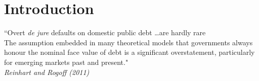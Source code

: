 \documentclass[12pt, aspectratio=169, xcolor=dvipsnames]{beamer}  %
\begin{document}






\section{Introduction}


\begin{frame}
	\begin{flushright}
	\begin{minipage}{.65\linewidth}
		\setlength{\parskip}{0pt}
		\begin{flushright}
			``Overt \textit{de jure} defaults on domestic public debt \ldots are hardly rare \\
			The assumption embedded in many theoretical models that governments always honour the nominal face value of debt is a significant overstatement, particularly for emerging markets past and present." \\ \vspace{0.4cm}
			\textit{Reinhart and Rogoff (2011)}
		\end{flushright}
	\end{minipage}
\end{flushright}
	
\end{frame}
\end{document}
